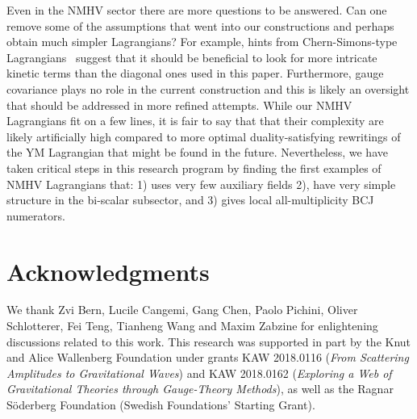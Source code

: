 \documentclass[11pt,a4paper]{article}
\begin{document}
Even in the NMHV sector there are more questions to be answered. Can one remove some of the assumptions that went into our constructions and perhaps obtain much simpler Lagrangians? For example, hints from Chern-Simons-type Lagrangians~\cite{Ben-Shahar:2021doh,Ben-Shahar:2021zww} suggest that it should be beneficial to look for more intricate kinetic terms than the diagonal ones used in this paper. Furthermore, gauge covariance plays no role in the current construction and this is likely an oversight that should be addressed in more refined attempts. While our NMHV Lagrangians fit on a few lines, it is fair to say that that their complexity are likely artificially high compared to more optimal duality-satisfying rewritings of the YM Lagrangian that might be found in the future. Nevertheless, we have taken critical steps in this research program by finding the first examples of NMHV Lagrangians that: 1) uses very few auxiliary fields 2), have very simple structure in the bi-scalar subsector, and 3) gives local all-multiplicity BCJ numerators.  






\bigskip



\section*{Acknowledgments} 


We thank Zvi Bern, Lucile Cangemi, Gang Chen, Paolo Pichini, Oliver Schlotterer, Fei Teng, Tianheng Wang and Maxim Zabzine for enlightening discussions related to this work. This research was supported in part by the Knut and Alice Wallenberg Foundation under grants KAW 2018.0116 ({\it From Scattering Amplitudes to Gravitational Waves}) and KAW 2018.0162 ({\it Exploring a Web of Gravitational Theories through Gauge-Theory Methods}), as well as the Ragnar S\"{o}derberg Foundation (Swedish Foundations’ Starting Grant). 






\end{document}
